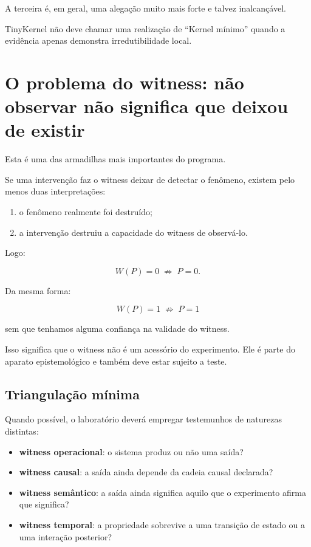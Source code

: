 \documentclass[11pt,a4paper]{article}
\begin{document}
A terceira é, em geral, uma alegação muito mais forte e talvez inalcançável.

\begin{falsifybox}
TinyKernel não deve chamar uma realização de ``Kernel mínimo'' quando a evidência
apenas demonstra irredutibilidade local.
\end{falsifybox}

\section{O problema do witness: não observar não significa que deixou de existir}

Esta é uma das armadilhas mais importantes do programa.

Se uma intervenção faz o witness deixar de detectar o fenômeno, existem pelo menos
duas interpretações:

\begin{enumerate}
  \item o fenômeno realmente foi destruído;
  \item a intervenção destruiu a capacidade do witness de observá-lo.
\end{enumerate}

Logo:

\[
W(P)=0 \;\not\Rightarrow\; P=0.
\]

Da mesma forma:

\[
W(P)=1 \;\not\Rightarrow\; P=1
\]

sem que tenhamos alguma confiança na validade do witness.

Isso significa que o witness não é um acessório do experimento. Ele é parte do
aparato epistemológico e também deve estar sujeito a teste.

\subsection{Triangulação mínima}

Quando possível, o laboratório deverá empregar testemunhos de naturezas distintas:

\begin{itemize}
  \item \textbf{witness operacional}: o sistema produz ou não uma saída?
  \item \textbf{witness causal}: a saída ainda depende da cadeia causal declarada?
  \item \textbf{witness semântico}: a saída ainda significa aquilo que o experimento
  afirma que significa?
  \item \textbf{witness temporal}: a propriedade sobrevive a uma transição de estado
  ou a uma interação posterior?
\end{itemize}
\end{document}
